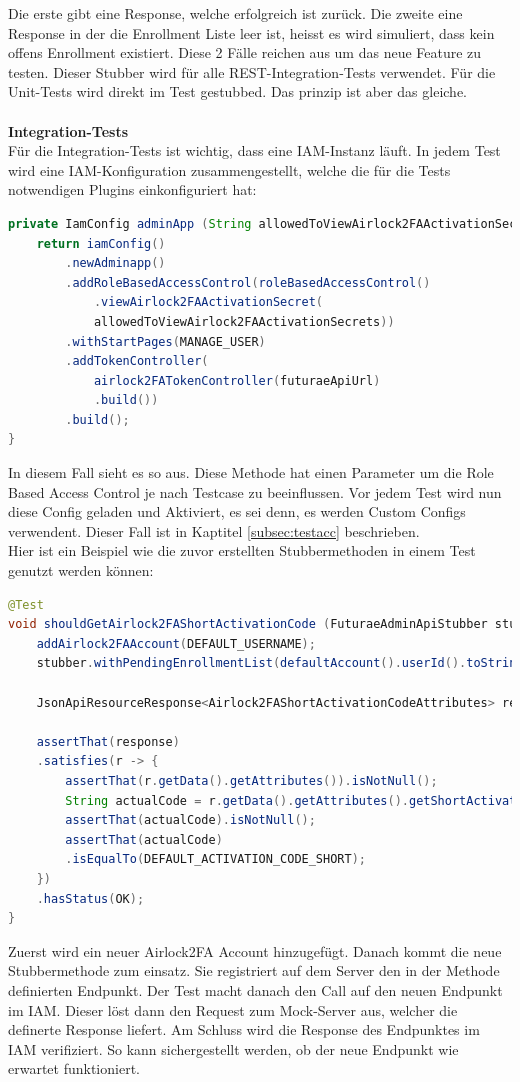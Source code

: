 Die erste gibt eine Response, welche erfolgreich ist zurück. Die zweite eine Response in der die Enrollment Liste leer ist, heisst es wird simuliert, dass kein offens Enrollment existiert. Diese 2 Fälle reichen aus um das neue Feature zu testen.
Dieser Stubber wird für alle REST-Integration-Tests verwendet. Für die Unit-Tests wird direkt im Test gestubbed. Das prinzip ist aber das gleiche.\\\\
\textbf{Integration-Tests}\label{header:inttest}\\
Für die Integration-Tests ist wichtig, dass eine IAM-Instanz läuft. In jedem Test wird eine IAM-Konfiguration zusammengestellt, welche die für die Tests notwendigen Plugins einkonfiguriert hat:
\begin{lstlisting}[language=Java]
private IamConfig adminApp (String allowedToViewAirlock2FAActivationSecrets) {
	return iamConfig()
		.newAdminapp()
		.addRoleBasedAccessControl(roleBasedAccessControl()
			.viewAirlock2FAActivationSecret(
			allowedToViewAirlock2FAActivationSecrets))
		.withStartPages(MANAGE_USER)
		.addTokenController(
			airlock2FATokenController(futuraeApiUrl)
			.build())
		.build();
}
\end{lstlisting}
In diesem Fall sieht es so aus.  Diese Methode hat einen Parameter um die Role Based Access Control je nach Testcase zu beeinflussen.
Vor jedem Test wird nun diese Config geladen und Aktiviert, es sei denn, es werden Custom Configs verwendent. Dieser Fall ist in Kaptitel \ref{subsec:testacc} beschrieben.\\
Hier ist ein Beispiel wie die zuvor erstellten Stubbermethoden in einem Test genutzt werden können:
\begin{lstlisting}[language=Java]
@Test
void shouldGetAirlock2FAShortActivationCode (FuturaeAdminApiStubber stubber) {
	addAirlock2FAAccount(DEFAULT_USERNAME);
	stubber.withPendingEnrollmentList(defaultAccount().userId().toString(), 1);
	
	JsonApiResourceResponse<Airlock2FAShortActivationCodeAttributes> response = getAirlock2FAShortActivationCode(DEFAULT_USERNAME);
	
	assertThat(response)
	.satisfies(r -> {
		assertThat(r.getData().getAttributes()).isNotNull();
		String actualCode = r.getData().getAttributes().getShortActivationCode();
		assertThat(actualCode).isNotNull();
		assertThat(actualCode)
		.isEqualTo(DEFAULT_ACTIVATION_CODE_SHORT);
	})
	.hasStatus(OK);
}
\end{lstlisting}
Zuerst wird ein neuer Airlock2FA Account hinzugefügt. Danach kommt die neue Stubbermethode zum einsatz. Sie registriert auf dem Server den in der Methode definierten Endpunkt. Der Test macht danach den Call auf den neuen Endpunkt im IAM. Dieser löst dann den Request zum Mock-Server aus, welcher die definerte Response liefert. Am Schluss wird die Response des Endpunktes im IAM verifiziert. So kann sichergestellt werden, ob der neue Endpunkt wie erwartet funktioniert.\\
